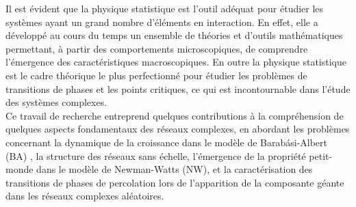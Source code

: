 Il est évident que la physique statistique est l'outil adéquat pour étudier les systèmes ayant un grand nombre d'éléments en interaction. En effet, elle a développé au cours du temps un ensemble de théories et d'outils mathématiques permettant, à partir des comportements microscopiques, de comprendre l'émergence des caractéristiques macroscopiques. En outre la physique statistique est le cadre théorique le plus perfectionné pour étudier les problèmes de transitions de phases et les points critiques, ce qui est incontournable dans l'étude des systèmes complexes. \\

Ce travail de recherche entreprend quelques contributions à la compréhension de quelques aspects fondamentaux des réseaux complexes, en abordant les problèmes concernant la dynamique de la croissance dans le modèle de Barabási-Albert (BA) \cite{BA1999}, la structure des réseaux  sans échelle, l'émergence de la propriété petit-monde dans le modèle de Newman-Watts \cite{Newman-Watts1999-2} (NW), et la caractérisation des transitions de phases de  percolation lors de l'apparition de la composante géante dans les réseaux complexes aléatoires.\\
